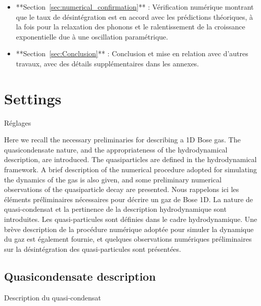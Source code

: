 \documentclass[aps,prd,notitlepage,amsfonts,amssymb,amsmath,nofootinbib,superscriptaddress,longbibliography]{revtex4-2}
\newcommand{\trad}[1]{\textcolor{tradcolor}{#1}}
\begin{document}
{\begin{enumerate}
\begin{itemize}
			\item **Section~\ref{sec:numerical_confirmation}** : Vérification numérique montrant que le taux de désintégration est en accord avec les prédictions théoriques, à la fois pour la relaxation des phonons et le ralentissement de la croissance exponentielle due à une oscillation paramétrique.
			\item **Section~\ref{sec:Conclusion}** : Conclusion et mise en relation avec d'autres travaux, avec des détails supplémentaires dans les annexes.
		\end{itemize}
\end{enumerate}
}

\section{Settings}
\label{sec:Settings}
\trad{Réglages}


Here we recall the necessary preliminaries for describing a 1D Bose gas.  The quasicondensate nature, and the appropriateness of the hydrodynamical description, are introduced.  The quasiparticles are defined in the hydrodynamical framework.  A brief description of the numerical procedure adopted for simulating the dynamics of the gas is also given, and some preliminary numerical observations of the quasiparticle decay are presented.
\trad{Nous rappelons ici les éléments préliminaires nécessaires pour décrire un gaz de Bose 1D. La nature de quasi-condensat et la pertinence de la description hydrodynamique sont introduites. Les quasi-particules sont définies dans le cadre hydrodynamique. Une brève description de la procédure numérique adoptée pour simuler la dynamique du gaz est également fournie, et quelques observations numériques préliminaires sur la désintégration des quasi-particules sont présentées.}


\subsection{Quasicondensate description
\label{subsec:quasicondensate}}
\trad{Description du quasi-condensat}
\end{document}
